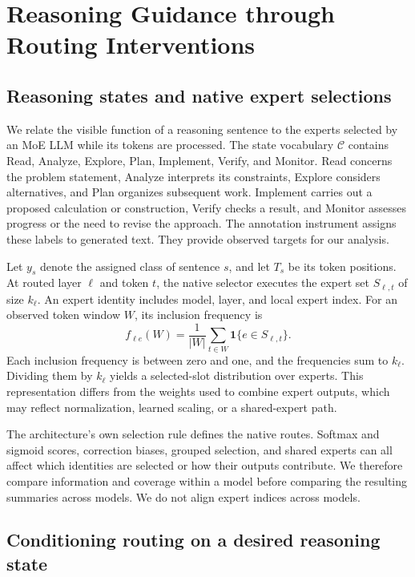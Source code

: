 \section{Reasoning Guidance through Routing Interventions}
\label{sec:method}

\subsection{Reasoning states and native expert selections}

We relate the visible function of a reasoning sentence to the experts selected by an MoE LLM while its tokens are processed.
%
The state vocabulary $\mathcal C$ contains Read, Analyze, Explore, Plan, Implement, Verify, and Monitor.
%
Read concerns the problem statement, Analyze interprets its constraints, Explore considers alternatives, and Plan organizes subsequent work.
%
Implement carries out a proposed calculation or construction, Verify checks a result, and Monitor assesses progress or the need to revise the approach.
%
The annotation instrument assigns these labels to generated text.
%
They provide observed targets for our analysis.
%

Let $y_s$ denote the assigned class of sentence $s$, and let $T_s$ be its token positions.
%
At routed layer $\ell$ and token $t$, the native selector executes the expert set $S_{\ell,t}$ of size $k_\ell$.
%
An expert identity includes model, layer, and local expert index.
%
For an observed token window $W$, its inclusion frequency is
\begin{equation}
 f_{\ell e}(W)=\frac{1}{|W|}\sum_{t\in W}
 \mathbf{1}\{e\in S_{\ell,t}\}.
 \label{eq:inclusion}
\end{equation}
Each inclusion frequency is between zero and one, and the frequencies sum to $k_\ell$.
%
Dividing them by $k_\ell$ yields a selected-slot distribution over experts.
%
This representation differs from the weights used to combine expert outputs, which may reflect normalization, learned scaling, or a shared-expert path.
%

The architecture's own selection rule defines the native routes.
%
Softmax and sigmoid scores, correction biases, grouped selection, and shared experts can all affect which identities are selected or how their outputs contribute.
%
We therefore compare information and coverage within a model before comparing the resulting summaries across models.
%
We do not align expert indices across models.
%

\subsection{Conditioning routing on a desired reasoning state}
\label{sec:conditioning}

